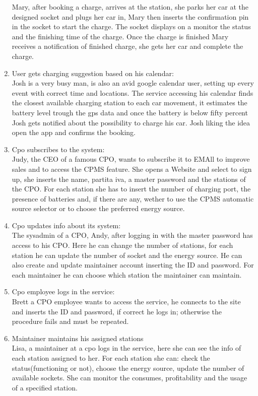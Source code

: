 \begin{enumerate}[label=S\arabic*]
            Mary, after booking a charge, arrives at the station, she parks her car at the designed socket
            and plugs her car in, Mary then inserts the confirmation pin in the socket to start the charge.
            The socket displays on a monitor the status and the finishing time of the charge.
            Once the charge is finished Mary receives a notification of finished charge,
            she gets her car and complete the charge.
      \item User gets charging suggestion based on his calendar:\\
            Josh is a very busy man, is also an avid google calendar user,
            setting up every event with correct time and locations.
            The service accessing his calendar finds the closest available charging station to each car movement,
            it estimates the battery level trough the gps data and once the battery is below fifty percent Josh gets notified
            about the possibility to charge his car.
            Josh liking the idea open the app and confirms the booking.
      \item Cpo subscribes to the system:\\
            Judy, the CEO of a famous CPO, wants to subscribe it to EMAll to improve sales and to access the CPMS feature.
            She opens a Website and select to sign up, she inserts the name, partita iva, a master password and the stations of the CPO.
            For each station she has to insert the number of charging port, the presence of batteries and, if there are any,
            wether to use the CPMS automatic source selector or to choose the preferred energy source.
      \item Cpo updates info about its system:\\
            The sysadmin of a CPO, Andy, after logging in with the master password has access to his CPO.
            Here he can change the number of stations, for each station he can update the number of socket and the energy source.
            He can also create and update maintainer account inserting the ID and password. For each maintainer he can choose which station the maintainer can maintain.
      \item Cpo employee logs in the service:\\
            Brett a CPO employee wants to access the service, he connects to the site and inserts the ID
            and password, if correct he logs in; otherwise the procedure fails and must be repeated.
      \item Maintainer maintains his assigned stations\\
            Lisa, a maintainer at a cpo logs in the service, here she can see the info of each station assigned to her.
            For each station she can: check the status(functioning or not), choose the energy source, update the number of available sockets.
            She can monitor the consumes, profitability and the usage of a specified station.
\end{enumerate}

